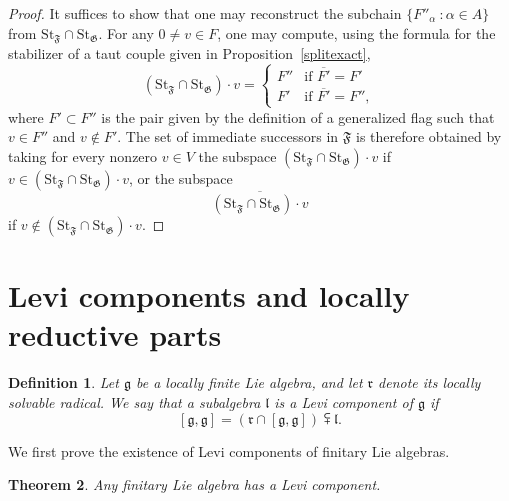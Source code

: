 \documentclass{article}
\newcommand {\St} {\mathrm{St}}
\def\g{\mathfrak {g}}
\def\l{\mathfrak {l}}
\def\r{\mathfrak{r}}
\def\F{\mathfrak{F}}
\def\G{\mathfrak{G}}
\newtheorem{thm}{Theorem}[section]
\newtheorem{defn}[thm]{Definition}
\begin{document}
\begin{proof}
It suffices to show that one may reconstruct the subchain $\{F''_\alpha ~\colon \alpha \in A \}$ from $\St_\F \cap \St_\G$.  For any $0 \neq v \in F$, one may compute, using the formula for the stabilizer of a taut couple given in Proposition~\ref{splitexact},
$$(\St_\F \cap \St_\G) \cdot v = 
\begin{cases}
F'' & \textrm{if } \overline{F'} = F' \\
F' & \textrm{if }\overline{F'} = F'',
\end{cases}$$
where $F' \subset F''$ is the pair given by the definition of a generalized flag such that $v \in F''$ and $v \notin F'$. 
The set of immediate successors in $\F$ is therefore obtained by taking for every nonzero $v \in V$ the subspace 
$(\St_\F \cap \St_\G) \cdot v$ if  $v \in (\St_\F \cap \St_\G) \cdot v$, or the subspace $$\overline{(\St_\F \cap \St_\G) \cdot v}$$ if $v \notin (\St_\F \cap \St_\G) \cdot v$.
\end{proof}


\section{Levi components and locally reductive parts} \label{secLevi}


\begin{defn} \label{levicomponent}
Let $\g$ be a locally finite Lie algebra, and let $\r$ denote its locally solvable radical.  We say that a subalgebra $\l$ is a \emph{Levi component} of $\g$ if $$[\g,\g] = (\r \cap [\g,\g]) \subsetplus \l.$$
\end{defn}


We first prove the existence of Levi components of finitary Lie algebras.
\begin{thm} \label{existence}
Any finitary Lie algebra has a Levi component.
\end{thm}
\end{document}

